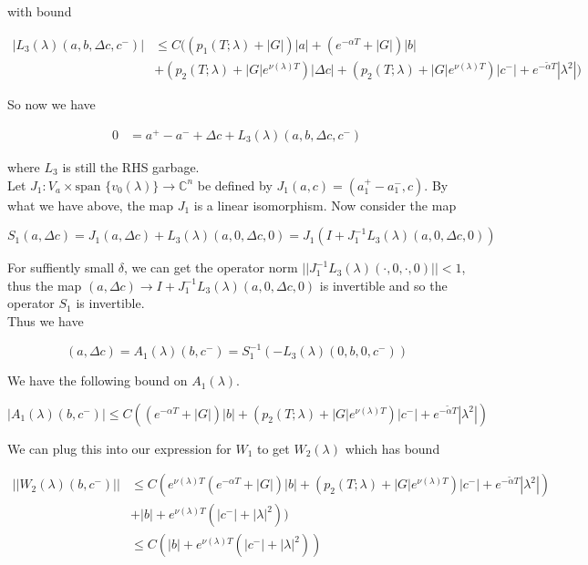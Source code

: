 \documentclass[12pt]{article}
\def\C{{\mathbb C}}
\begin{document}
\begin{enumerate}
with bound

\begin{align*}
|L_3(\lambda)(a, b, \Delta c, c^-)| &\leq C ( (p_1(T; \lambda) + |G|)|a| + (e^{-\alpha T} + |G|)|b| \\
&+ ( p_2(T; \lambda) + |G|e^{\nu(\lambda)T})|\Delta c| + ( p_2(T; \lambda) + |G|e^{\nu(\lambda)T})|c^-|+ e^{-\tilde{\alpha} T} |\lambda^2| )
\end{align*}

So now we have 

\begin{align*}
0 &= a^+ - a^- + \Delta c + L_3(\lambda)(a, b, \Delta c, c^-)
\end{align*}

where $L_3$ is still the RHS garbage.\\

Let $J_1: V_a \times \text{span }\{v_0(\lambda)\} \rightarrow \C^n$ be defined by $J_1(a, c) = (a_1^+ - a_1^-, c)$. By what we have above, the map $J_1$ is a linear isomorphism. Now consider the map

\[
S_1(a, \Delta c) = J_1 (a, \Delta c) + L_3(\lambda)(a, 0, \Delta c, 0) = J_1( I + J_1^{-1} L_3(\lambda)(a, 0, \Delta c, 0) )
\]


For suffiently small $\delta$, we can get the operator norm $||J_1^{-1} L_3(\lambda)(\cdot, 0, \cdot, 0)|| < 1$, thus the map $(a, \Delta c) \rightarrow I + J_1^{-1} L_3(\lambda)(a, 0, \Delta c, 0)$ is invertible and so the operator $S_1$ is invertible.\\

Thus we have

\[
(a, \Delta c) = A_1(\lambda)(b, c^-) = S_1^{-1}(- L_3(\lambda)(0, b, 0, c^-))
\]


We have the following bound on $A_1(\lambda)$.

\[
|A_1(\lambda)(b, c^-)| \leq C ( (e^{-\alpha T} + |G|)|b| + ( p_2(T; \lambda) + |G|e^{\nu(\lambda)T})|c^-| + e^{-\tilde{\alpha}T} |\lambda^2|)
\]

We can plug this into our expression for $W_1$ to get $W_2(\lambda)$ which has bound


\begin{align*}
||W_2(\lambda)(b,c^-)|| &\leq C (e^{\nu(\lambda)T}(e^{-\alpha T} + |G|)|b| + ( p_2(T; \lambda) + |G|e^{\nu(\lambda)T})|c^-| + e^{-\tilde{\alpha}T} |\lambda^2|) \\
&+ |b| + e^{\nu(\lambda)T}(|c^-| + |\lambda|^2)) \\
&\leq C (|b| + e^{\nu(\lambda)T}(|c^-| + |\lambda|^2))
\end{align*}


\end{enumerate}
\end{document}
